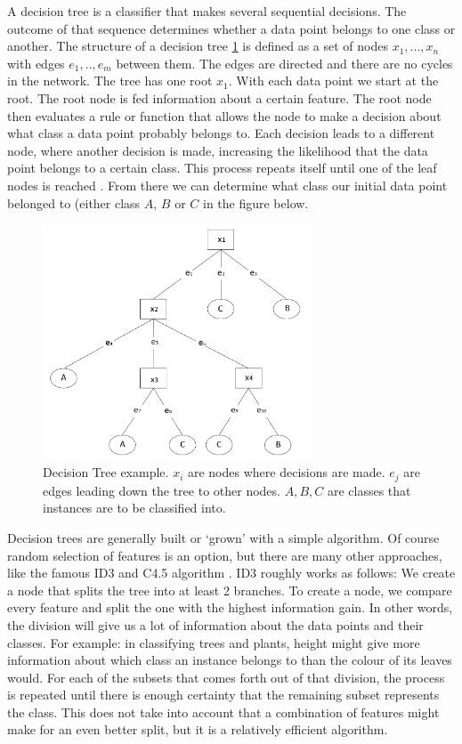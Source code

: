A decision tree is a classifier that makes several sequential decisions. The outcome of that sequence determines whether a data point belongs to one class or another. The structure of a decision tree \ref{fig:DT} is defined as a set of nodes ${x_1, ... , x_n}$ with edges ${e_1, .., e_{m}}$ between them. The edges are directed and there are no cycles in the network. The tree has one root $x_1$. With each data point we start at the root. The root node is fed information about a certain feature. The root node then evaluates a rule or function that allows the node to make a decision about what class a data point probably belongs to. Each decision leads to a different node, where another decision is made, increasing the likelihood that the data point belongs to a certain class. This process repeats itself until one of the leaf nodes is reached \cite{safavian1991survey}. From there we can determine what class our initial data point belonged to (either class $A$, $B$ or $C$ in the figure below. 

\begin{figure}[H]
    \includegraphics[width=80mm]{./img/decisiontree.png}
    \caption{\footnotesize{Decision Tree example. $x_i$ are nodes where decisions are made. $e_j$ are edges leading down the tree to other nodes. $A,B,C$ are classes that instances are to be classified into.}}
    \label{fig:DT}
\end{figure}

Decision trees are generally built or `grown' with a simple algorithm. Of course random selection of features is an option, but there are many other approaches, like the famous ID3 and C4.5 algorithm \cite{niuniu2010review}. ID3 roughly works as follows: We create a node that splits the tree into at least 2 branches. To create a node, we compare every feature and split the one with the highest information gain. In other words, the division will give us a lot of information about the data points and their classes. For example: in classifying trees and plants, height might give more information about which class an instance belongs to than the colour of its leaves would. For each of the subsets that comes forth out of that division, the process is repeated until there is enough certainty that the remaining subset represents the class. This does not take into account that a combination of features might make for an even better split, but it is a relatively efficient algorithm. %

